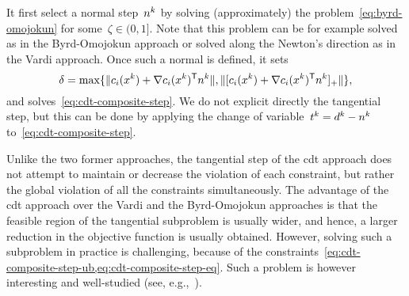 It first select a normal step~$\nstep[k]$ by solving (approximately) the problem~\cref{eq:byrd-omojokun} for some~$\zeta \in (0, 1]$.
Note that this problem can be for example solved as in the Byrd-Omojokun approach or solved along the Newton's direction as in the Vardi approach.
Once such a normal is defined, it sets
\begin{equation*}
    \delta = \max \set{\norm{\con{i}(\iter[k]) + \nabla \con{i}(\iter[k])^{\T} \nstep[k]}, \norm{\posp{\con{i}(\iter[k]) + \nabla \con{i}(\iter[k])^{\T} \nstep[k]}}},
\end{equation*}
and solves~\cref{eq:cdt-composite-step}.
We do not explicit directly the tangential step, but this can be done by applying the change of variable~$\tstep[k] = \step[k] - \nstep[k]$ to~\cref{eq:cdt-composite-step}.

Unlike the two former approaches, the tangential step of the \gls{cdt} approach does not attempt to maintain or decrease the violation of each constraint, but rather the global violation of all the constraints simultaneously.
The advantage of the \gls{cdt} approach over the Vardi and the Byrd-Omojokun approaches is that the feasible region of the tangential subproblem is usually wider, and hence, a larger reduction in the objective function is usually obtained.
However, solving such a subproblem in practice is challenging, because of the constraints~\cref{eq:cdt-composite-step-ub,eq:cdt-composite-step-eq}.
Such a problem is however interesting and well-studied (see, e.g.,~\cite{Chen_Yuan_1999,Ai_Zhang_2009,Chen_Yuan_2009,Bienstock_2016}).
